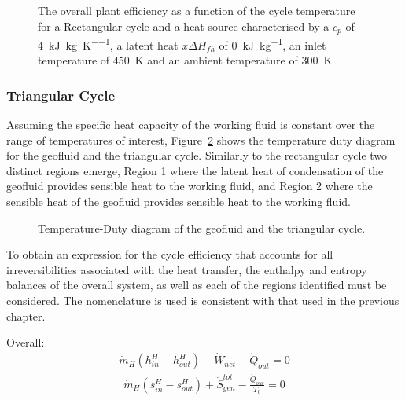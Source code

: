         \begin{figure}[H]
            \centering
            
            \caption[The overall plant efficiency for different latent heats as a function of maximum cycle temperature.]{The overall plant efficiency as a function of the cycle temperature for a Rectangular cycle and a heat source characterised by a \(c_p\) of \qty{4}{\kilo\joule\per\kg\per\K}, a latent heat \(x\Delta H_{fh}\) of \qty{0}{\kilo\joule\per\kg}, an inlet temperature of \qty{450}{\K} and an ambient temperature of \qty{300}{\K}}
            \label{fig:litrev_GenericSource_Carnot}
        \end{figure}

        \subsubsection{Triangular Cycle}

        Assuming the specific heat capacity of the working fluid is constant over the range of temperatures of interest, Figure~\ref{fig:TQ_Tri} shows the temperature duty diagram for the geofluid and the triangular cycle. Similarly to the rectangular cycle two distinct regions emerge, Region 1 where the latent heat of condensation of the geofluid provides sensible heat to the working fluid, and Region 2 where the sensible heat of the geofluid provides sensible heat to the working fluid.

        \begin{figure}[H]
            \centering
            
            \caption{Temperature-Duty diagram of the geofluid and the triangular cycle.}
            \label{fig:TQ_Tri}
        \end{figure}

        To obtain an expression for the cycle efficiency that accounts for all irreversibilities associated with the heat transfer, the enthalpy and entropy balances of the overall system, as well as each of the regions identified must be considered. The nomenclature is used is consistent with that used in the previous chapter.

        Overall:
        \begin{align}
             \Dot{m}_{H}(h_{in}^{H}-h_{out}^{H}) - \Dot{W}_{net} - \Dot{Q}_{out} = 0\label{eq:tri_h_bal}
        \end{align}
        \begin{align}
             \Dot{m}_{H}(s_{in}^{H}-s_{out}^{H}) + \Dot{S}_{gen}^{tot} - \frac{\Dot{Q}_{out}}{T_0} = 0 \label{eq:tri_s_bal}
        \end{align}

